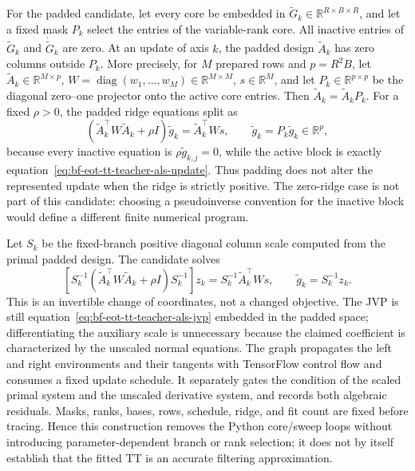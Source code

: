 For the padded candidate, let every core be embedded in
\(\widetilde G_k\in\mathbb R^{R\times B\times R}\), and let a fixed mask
\(P_k\) select the entries of the variable-rank core.  All inactive entries of
\(\widetilde G_k\) and \(\dot{\widetilde G}_k\) are zero.  At an update of
axis \(k\), the padded design \(\widetilde A_k\) has zero columns outside
\(P_k\).  More precisely, for \(M\) prepared rows and
\(p=R^2B\), let
\(\widetilde A_k\in\mathbb R^{M\times p}\),
\(W=\operatorname{diag}(w_1,\ldots,w_M)\in\mathbb R^{M\times M}\),
\(s\in\mathbb R^M\), and let
\(P_k\in\mathbb R^{p\times p}\) be the diagonal zero--one projector
onto the active core entries.  Then
\(\widetilde A_k=\widetilde A_kP_k\).  For a fixed \(\rho>0\), the
padded ridge equations split as
\begin{equation}
 \left(\widetilde A_k^\top W\widetilde A_k+\rho I\right)
 \widetilde g_k=\widetilde A_k^\top Ws,
 \qquad
 \widetilde g_k=P_k\widetilde g_k\in\mathbb R^p,
 \label{eq:bf-eot-tt-teacher-padded-als}
\end{equation}
because every inactive equation is \(\rho\widetilde g_{k,j}=0\), while the
active block is exactly equation~\eqref{eq:bf-eot-tt-teacher-als-update}.
Thus padding does not alter the represented update when the ridge is strictly
positive.  The zero-ridge case is not part of this candidate: choosing a
pseudoinverse convention for the inactive block would define a different
finite numerical program.

Let \(S_k\) be the fixed-branch positive diagonal column scale computed from
the primal padded design.  The candidate solves
\begin{equation}
 \left[S_k^{-1}\left(\widetilde A_k^\top W\widetilde A_k+\rho I\right)
 S_k^{-1}\right]z_k
 =S_k^{-1}\widetilde A_k^\top Ws,
 \qquad \widetilde g_k=S_k^{-1}z_k .
 \label{eq:bf-eot-tt-teacher-padded-scaled-solve}
\end{equation}
This is an invertible change of coordinates, not a changed objective.  The JVP
is still equation~\eqref{eq:bf-eot-tt-teacher-als-jvp} embedded in the padded
space; differentiating the auxiliary scale is unnecessary because the claimed
coefficient is characterized by the unscaled normal equations.  The graph
propagates the left and right environments and their tangents with TensorFlow
control flow and consumes a fixed update schedule.  It separately gates the
condition of the scaled primal system and the unscaled derivative system, and
records both algebraic residuals.  Masks, ranks, bases, rows, schedule, ridge,
and fit count are fixed before tracing.  Hence this construction removes the
Python core/sweep loops without introducing parameter-dependent branch or rank
selection; it does not by itself establish that the fitted TT is an accurate
filtering approximation.

\FloatBarrier
